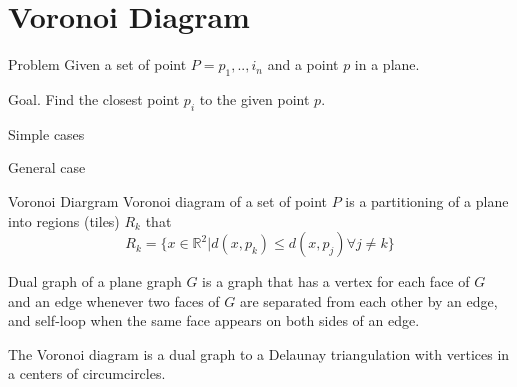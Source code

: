 \documentclass[10pt]{beamer}
\begin{document}
\section{Voronoi Diagram}

\begin{frame}{Problem}
	\alert{Given} a set of point $P={p_1,..,i_n}$ and a point $p$  in a plane.
	\bigskip
	
	\alert{Goal.} Find the closest point $p_i$ to the given point $p$.
\end{frame}

\begin{frame}{Simple cases}
\end{frame}



\begin{frame}{General case}
\end{frame}


\begin{frame}{Voronoi Diargram}
	\alert{Voronoi diagram} of a set of point $P$ is a partitioning of a plane into 
	regions (tiles) $R_k$ that
	$$
		R_k =  \{x \in  \mathbb{R}^2 | d(x,p_k) \leq d(x,p_j) \forall j \neq k \}
	$$
	
	\alert{Dual graph} of a plane graph $G$ is a graph that has a vertex 
	for each face of $G$ and an edge whenever two faces of $G$ are separated 
	from each other by an edge, and self-loop when the same face appears on both
	sides of an edge.
	\bigskip
	
	The Voronoi diagram is a dual graph to a Delaunay triangulation with vertices 
	in a centers of circumcircles. 
\end{frame}
\end{document}
